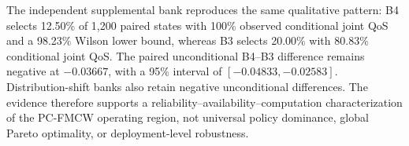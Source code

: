 The independent supplemental bank reproduces the same qualitative pattern: B4 selects 12.50\% of 1,200 paired states with 100\% observed conditional joint QoS and a 98.23\% Wilson lower bound, whereas B3 selects 20.00\% with 80.83\% conditional joint QoS. The paired unconditional B4--B3 difference remains negative at $-0.03667$, with a 95\% interval of $[-0.04833,-0.02583]$. Distribution-shift banks also retain negative unconditional differences. The evidence therefore supports a reliability--availability--computation characterization of the PC-FMCW operating region, not universal policy dominance, global Pareto optimality, or deployment-level robustness.
